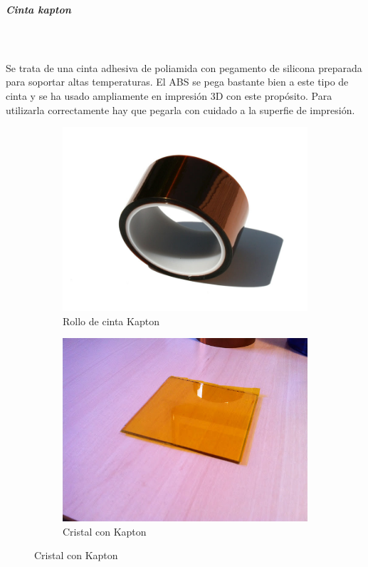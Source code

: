 \documentclass[11pt,a4paper]{article}
\begin{document}
				\subparagraph{Cinta kapton}\mbox{}\\\\
Se trata de una cinta adhesiva de poliamida con pegamento de silicona preparada para soportar altas temperaturas. El ABS se pega bastante bien a este tipo de cinta y se ha usado ampliamente en impresión 3D con este propósito. Para utilizarla correctamente hay que pegarla con cuidado a la superfie de impresión.
\begin{figure}[H]
    \centering
    \begin{subfigure}[b]{0.4\textwidth}
        \includegraphics[width=\textwidth,cfbox=azul_marcos 4pt 0pt]{FOTOS/KAPTON1}
	\caption*{Rollo de cinta Kapton}
    \end{subfigure}
    \qquad %
    \begin{subfigure}[b]{0.4\textwidth}
        \includegraphics[width=\textwidth,cfbox=azul_marcos 4pt 0pt]{FOTOS/KAPTON2}
	\caption*{Cristal con Kapton}
    \end{subfigure}   
\end{figure}
\end{document}
